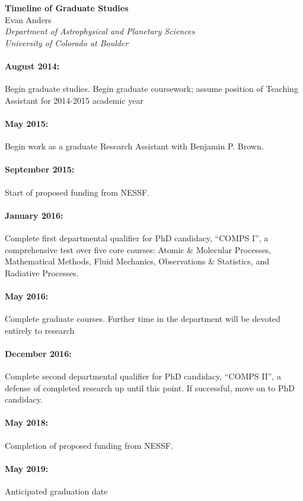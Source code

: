 \documentclass[aasms,12pt]{article}
\begin{document}
\begin{center}
   \large\textbf{Timeline of Graduate Studies}\\
   \vspace{0.4cm}
   \large{Evan Anders}\\
   \normalsize\textit{Department of Astrophysical and Planetary Sciences}\\
   \normalsize\textit{University of Colorado at Boulder}\\
\end{center}

\paragraph{August 2014:} Begin graduate studies.  Begin graduate coursework;
	assume position of Teaching Assistant for 2014-2015 academic year

\paragraph{May 2015:} Begin work as a graduate Research Assistant with
	Benjamin P. Brown.

\paragraph{September 2015:} Start of proposed funding from NESSF.

\paragraph{January 2016:} Complete first departmental qualifier for PhD candidacy,
``COMPS I'', a comprehensive test over five core courses: Atomic \& Molecular Processes,
Mathematical Methods, Fluid Mechanics, Observations \& Statistics, and Radiative
Processes.

\paragraph{May 2016:} Complete graduate courses.  Further time in the department
will be devoted entirely to research

\paragraph{December 2016:} Complete second departmental qualifier for PhD candidacy,
``COMPS II'', a defense of completed research up until this point.  If successful,
move on to PhD candidacy.

\paragraph{May 2018:} Completion of proposed funding from NESSF.

\paragraph{May 2019:} Anticipated graduation date
\end{document}
